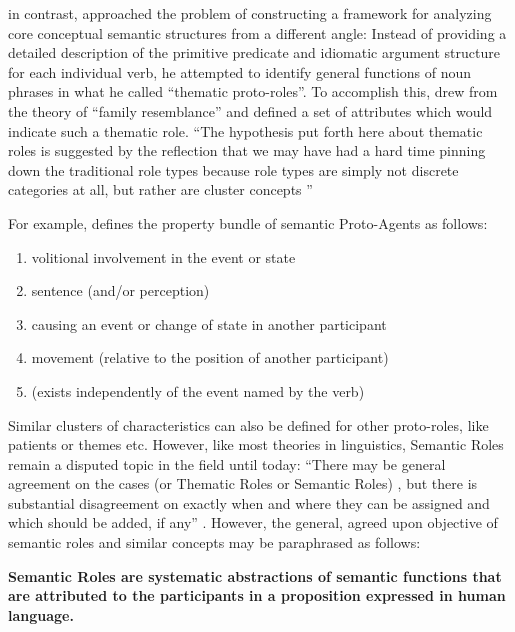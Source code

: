 \cite{dowty1991thematic} in contrast, approached the problem of constructing a framework for
analyzing core conceptual semantic structures from a different angle: Instead of providing
a detailed description of the primitive predicate and idiomatic argument structure for each
individual verb, he attempted to identify general functions of noun phrases in what he called
``thematic proto-roles''. To accomplish this, \citeauthor{dowty1991thematic} drew from the
theory of ``family resemblance'' and defined a set of attributes which would indicate such
a thematic role. ``The hypothesis put forth here about thematic roles is suggested by the
reflection that we may have had a hard time pinning down the traditional role types because
role types are simply not discrete categories at all, but rather are cluster concepts
\textelp{}'' \citep[p.~571]{dowty1991thematic}

For example, \citep[p.~572]{dowty1991thematic} defines the property bundle of semantic Proto-Agents
as follows:

\begin{enumerate}[label=\alph*]
  \item volitional involvement in the event or state
  \item sentence (and/or perception)
  \item causing an event or change of state in another participant
  \item movement (relative to the position of another participant)
  \item (exists independently of the event named by the verb)
\end{enumerate}

Similar clusters of characteristics can also be defined for other proto-roles, like
patients or themes etc. However, like most theories in linguistics, Semantic Roles
remain a disputed topic in the field until today: ``There may be general agreement on
the cases (or Thematic Roles or Semantic Roles) \textelp{}, but there is substantial
disagreement on exactly when and where they can be assigned and which \textelp{}
should be added, if any'' \citep{palmer2010semantic}. However, the general, agreed
upon objective of semantic roles and similar concepts may be paraphrased as follows:

\begin{examples}
  \item \textbf{Semantic Roles are systematic abstractions of semantic functions that are attributed
  to the participants in a proposition expressed in human language.}
\end{examples}

